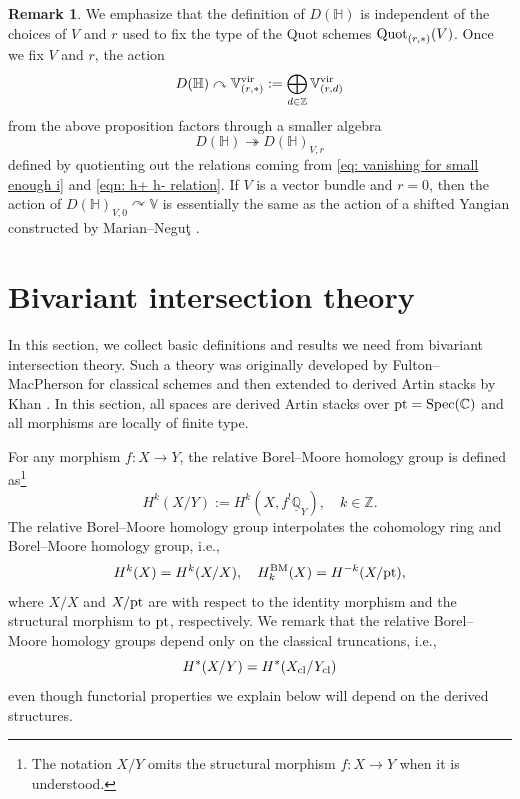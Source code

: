 \documentclass[10pt]{amsart}
\newcommand{\BZ}{\mathbb{Z}}
\newcommand{\BQ}{\mathbb{Q}}
\newcommand{\BC}{\mathbb{C}}
\newcommand{\BH}{\mathbb{H}}
\newcommand{\BV}{\mathbb{V}}
\newcommand{\Quot}{\textnormal{Quot}}
\newcommand{\BM}{\textnormal{BM}}
\newcommand{\+}{{}^+}
\newcommand{\pt}{\textnormal{pt}}
\newcommand{\vir}{\textnormal{vir}}
\theoremstyle{definition}
\theoremstyle {definition}
\newtheorem{remark}[theorem]{Remark}
\theoremstyle {definition}
\begin{document}
\begin{remark}\label{rem: relation to MN}
We emphasize that the definition of $D(\BH)$ is independent of the choices of $V$ and $r$ used to fix the type of the Quot schemes $\Quot_{(r,*)}(V)$. Once we fix $V$ and $r$, the action
$$D(\BH)\curvearrowright \BV^\vir_{(r,*)}:=\bigoplus_{d\in \BZ}\BV^\vir_{(r,d)}
$$
from the above proposition factors through a smaller algebra
$$D(\BH)\twoheadrightarrow D(\BH)_{V,r}
$$
defined by quotienting out the relations coming from \eqref{eq: vanishing for small enough i} and \eqref{eqn: h+ h- relation}. If $V$ is a vector bundle and $r=0$, then the action of $D(\BH)_{V,0}\curvearrowright\BV$ is essentially the same as the action of a shifted Yangian constructed by Marian--Negu\c t \cite{marian2026cohomologyquotschemesmooth}. 
    
\end{remark}








\appendix





\section{Bivariant intersection theory}

In this section, we collect basic definitions and results we need from bivariant intersection theory. Such a theory was originally developed by Fulton--MacPherson \cite{FM} for classical schemes and then extended to derived Artin stacks by Khan \cite{Khan}. In this section, all spaces are derived Artin stacks over $\pt=\textnormal{Spec}(\BC)$ and all morphisms are locally of finite type. 

For any morphism $f:X\rightarrow Y$, the relative Borel--Moore homology group is defined as\footnote{The notation $X/Y$ omits the structural morphism $f:X\rightarrow Y$ when it is understood.}
$$H^k(X/Y):=H^k(X,f^!\underline{\BQ}_Y),\quad k\in \BZ.
$$
The relative Borel--Moore homology group interpolates the cohomology ring and Borel--Moore homology group, i.e., 
$$H^k(X)=H^k(X/X),\quad H^{\BM}_k(X)=H^{-k}(X/\pt),
$$
where $X/X$ and $X/\pt$ are with respect to the identity morphism and the structural morphism to $\pt$, respectively. We remark that the relative Borel--Moore homology groups depend only on the classical truncations, i.e., 
$$H^*(X/Y)=H^*(X_{\textnormal{cl}}/Y_{\textnormal{cl}})
$$
even though functorial properties we explain below will depend on the derived structures.
\end{document}

